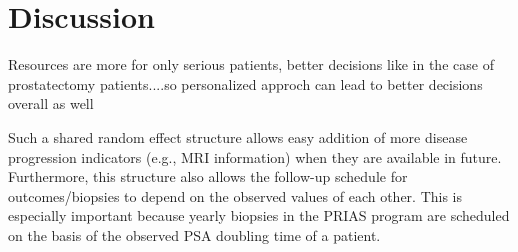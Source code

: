 \section{Discussion}
Resources are more for only serious patients, better decisions like in the case of prostatectomy patients....so personalized approch can lead to better decisions overall as well

 Such a shared random effect structure allows easy addition of more disease progression indicators (e.g., MRI information) when they are available in future. Furthermore, this structure also allows the follow-up schedule for outcomes/biopsies to depend on the observed values of each other. This is especially important because yearly biopsies in the PRIAS program are scheduled on the basis of the observed PSA doubling time of a patient.

